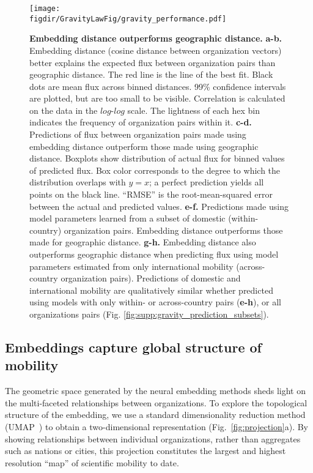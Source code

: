 \documentclass[12pt]{article} %
\def\figdir{../Figs}
\begin{document}
%
%
\begin{figure}[h!]
	\centering
	\texttt{[image: \\figdir/GravityLawFig/gravity\_performance.pdf]}
	\caption{
		\textbf{Embedding distance outperforms geographic distance.}
		\textbf{a-b.} Embedding distance (cosine distance between organization vectors) better explains the expected flux between organization pairs than geographic distance.
		The red line is the line of the best fit.
		Black dots are mean flux across binned distances.
		99\% confidence intervals are plotted, but are too small to be visible.
		Correlation is calculated on the data in the $log$-$log$ scale. 
		The lightness of each hex bin indicates the frequency of organization pairs within it.
		\textbf{c-d.} Predictions of flux between organization pairs made using embedding distance outperform those made using geographic distance.
		Boxplots show distribution of actual flux for binned values of predicted flux.
		Box color corresponds to the degree to which the distribution overlaps with $y = x$;
		a perfect prediction yields all points on the black line.
		``RMSE'' is the root-mean-squared error between the actual and predicted values.
		\textbf{e-f.} Predictions made using model parameters learned from a subset of domestic (within-country) organization pairs.
		Embedding distance outperforms those made for geographic distance.
		\textbf{g-h.} Embedding distance also outperforms geographic distance when predicting flux using model parameters estimated from only international mobility (across-country organization pairs).
		Predictions of domestic and international mobility are qualitatively similar whether predicted using models with only within- or across-country pairs (\textbf{e-h}), or all organizations pairs (Fig. \ref{fig:supp:gravity_prediction_subsets}).
	}
	\label{fig:gravity_performance}
\end{figure}


\subsection*{Embeddings capture global structure of mobility}

The geometric space generated by the neural embedding methods sheds light on the multi-faceted relationships between organizations. To explore the topological structure of the embedding, we use a standard dimensionality reduction method (UMAP~\autocite{mcinnes2018umap}) to obtain a two-dimensional representation (Fig.~\ref{fig:projection}a).
By showing relationships between individual organizations, rather than aggregates such as nations or cities, this projection constitutes the largest and highest resolution ``map'' of scientific mobility to date.
\end{document}
